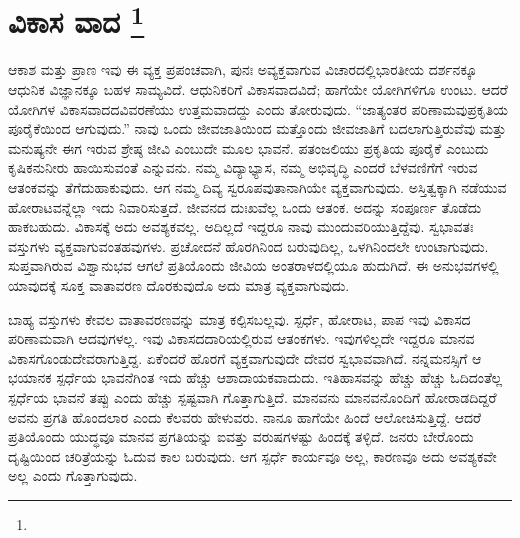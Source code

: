 
\chapter[ವಿಕಾಸ ವಾದ ]{ವಿಕಾಸ ವಾದ \protect\footnote{}}

ಆಕಾಶ ಮತ್ತು ಪ್ರಾಣ ಇವು ಈ ವ್ಯಕ್ತ ಪ್ರಪಂಚವಾಗಿ, ಪುನಃ ಅವ್ಯಕ್ತವಾಗುವ ವಿಚಾರದಲ್ಲಿ\break ಭಾರತೀಯ ದರ್ಶನಕ್ಕೂ ಆಧುನಿಕ ವಿಜ್ಞಾನಕ್ಕೂ ಬಹಳ ಸಾಮ್ಯವಿದೆ. ಆಧುನಿಕರಿಗೆ ವಿಕಾಸ\-ವಾದವಿದೆ; ಹಾಗೆಯೇ ಯೋಗಿಗಳಿಗೂ ಉಂಟು. ಆದರೆ ಯೋಗಿಗಳ ವಿಕಾಸವಾದದ\break ವಿವರಣೆಯು ಉತ್ತಮವಾದದ್ದು ಎಂದು ತೋರುವುದು. “ಜಾತ್ಯಂತರ ಪರಿಣಾಮವು\break ಪ್ರಕೃತಿಯ ಪೂರೈಕೆಯಿಂದ ಆಗುವುದು.” ನಾವು ಒಂದು ಜೀವಜಾತಿಯಿಂದ ಮತ್ತೊಂದು ಜೀವಜಾತಿಗೆ ಬದಲಾಗುತ್ತಿರುವೆವು ಮತ್ತು ಮನುಷ್ಯನೇ ಈಗ ಇರುವ ಶ್ರೇಷ್ಠ ಜೀವಿ ಎಂಬುದೇ ಮೂಲ ಭಾವನೆ. ಪತಂಜಲಿಯು ಪ್ರಕೃತಿಯ ಪೂರೈಕೆ ಎಂಬುದು ಕೃಷಿಕನು\break ನೀರು ಹಾಯಿಸುವಂತೆ ಎನ್ನುವನು. ನಮ್ಮ ವಿದ್ಯಾಭ್ಯಾಸ, ನಮ್ಮ ಅಭಿವೃದ್ಧಿ ಎಂದರೆ ಬೆಳವಣಿಗೆಗೆ ಇರುವ ಆತಂಕವನ್ನು ತೆಗೆದುಹಾಕುವುದು. ಆಗ ನಮ್ಮ ದಿವ್ಯ ಸ್ವರೂಪವು\break ತಾನಾಗಿಯೇ ವ್ಯಕ್ತವಾಗುವುದು. ಅಸ್ತಿತ್ವಕ್ಕಾಗಿ ನಡೆಯುವ ಹೋರಾಟವನ್ನೆಲ್ಲಾ ಇದು ನಿವಾರಿಸುತ್ತದೆ. ಜೀವನದ ದುಃಖವೆಲ್ಲ ಒಂದು ಆತಂಕ. ಅದನ್ನು ಸಂಪೂರ್ಣ ತೊಡೆದು ಹಾಕಬಹುದು. ವಿಕಾಸಕ್ಕೆ ಅದು ಅವಶ್ಯಕವಲ್ಲ. ಅದಿಲ್ಲದೆ ಇದ್ದರೂ ನಾವು ಮುಂದುವರಿಯು\-ತ್ತಿದ್ದೆವು. ಸ್ವಭಾವತಃ ವಸ್ತುಗಳು ವ್ಯಕ್ತವಾಗುವಂತಹವುಗಳು. ಪ್ರಚೋದನೆ ಹೊರಗಿನಿಂದ ಬರುವುದಿಲ್ಲ, ಒಳಗಿನಿಂದಲೇ ಉಂಟಾಗುವುದು. ಸುಪ್ತವಾಗಿರುವ ವಿಶ್ವಾನುಭವ ಆಗಲೆ ಪ್ರತಿಯೊಂದು ಜೀವಿಯ ಅಂತರಾಳದಲ್ಲಿಯೂ ಹುದುಗಿದೆ. ಈ ಅನುಭವಗಳಲ್ಲಿ ಯಾವುದಕ್ಕೆ ಸೂಕ್ತ ವಾತಾವರಣ ದೊರಕುವುದೊ ಅದು ಮಾತ್ರ ವ್ಯಕ್ತವಾಗುವುದು.

ಬಾಹ್ಯ ವಸ್ತುಗಳು ಕೇವಲ ವಾತಾವರಣವನ್ನು ಮಾತ್ರ ಕಲ್ಪಿಸಬಲ್ಲವು. ಸ್ಪರ್ಧೆ, ಹೋರಾಟ, ಪಾಪ ಇವು ವಿಕಾಸದ ಪರಿಣಾಮವಾಗಿ ಆದವುಗಳಲ್ಲ. ಇವು ವಿಕಾಸದ\break ದಾರಿಯಲ್ಲಿರುವ ಆತಂಕಗಳು. ಇವುಗಳಿಲ್ಲದೇ ಇದ್ದರೂ ಮಾನವ ವಿಕಾಸಗೊಂಡು\break ದೇವರಾಗುತ್ತಿದ್ದ. ಏಕೆಂದರೆ ಹೊರಗೆ ವ್ಯಕ್ತವಾಗುವುದೇ ದೇವರ ಸ್ವಭಾವವಾಗಿದೆ. ನನ್ನ\break ಮನಸ್ಸಿಗೆ ಆ ಭಯಾನಕ ಸ್ಪರ್ಧೆಯ ಭಾವನೆಗಿಂತ ಇದು ಹೆಚ್ಚು ಆಶಾದಾಯಕವಾದುದು. ಇತಿಹಾಸವನ್ನು ಹೆಚ್ಚು ಹೆಚ್ಚು ಓದಿದಂತೆಲ್ಲ ಸ್ಪರ್ಧೆಯ ಭಾವನೆ ತಪ್ಪು ಎಂದು ಹೆಚ್ಚು ಸ್ಪಷ್ಟವಾಗಿ ಗೊತ್ತಾಗುತ್ತಿದೆ. ಮಾನವನು ಮಾನವನೊಂದಿಗೆ ಹೋರಾಡದಿದ್ದರೆ ಅವನು ಪ್ರಗತಿ ಹೊಂದಲಾರ ಎಂದು ಕೆಲವರು ಹೇಳುವರು. ನಾನೂ ಹಾಗೆಯೇ ಹಿಂದೆ ಆಲೋಚಿಸುತ್ತಿದ್ದೆ. ಆದರೆ ಪ್ರತಿಯೊಂದು ಯುದ್ಧವೂ ಮಾನವ ಪ್ರಗತಿಯನ್ನು ಐವತ್ತು ವರುಷಗಳಷ್ಟು ಹಿಂದಕ್ಕೆ ತಳ್ಳಿದೆ. ಜನರು ಬೇರೊಂದು ದೃಷ್ಟಿಯಿಂದ ಚರಿತ್ರೆಯನ್ನು ಓದುವ ಕಾಲ ಬರುವುದು. ಆಗ ಸ್ಪರ್ಧೆ ಕಾರ್ಯವೂ ಅಲ್ಲ, ಕಾರಣವೂ ಅದು ಅವಶ್ಯಕವೇ ಅಲ್ಲ ಎಂದು ಗೊತ್ತಾಗುವುದು.

